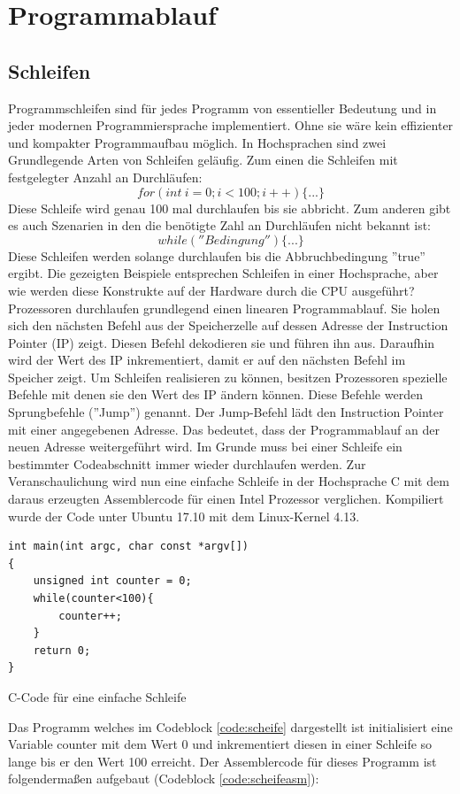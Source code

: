 \documentclass[a4paper,12pt]{article}
\begin{document}

\newpage
\section{Programmablauf}	\label{sec:programmablauf}
\subsection{Schleifen}
Programmschleifen sind für jedes Programm von essentieller Bedeutung und in jeder modernen Programmiersprache implementiert. Ohne sie wäre kein effizienter und kompakter Programmaufbau möglich. In Hochsprachen sind zwei Grundlegende Arten von Schleifen geläufig. Zum einen die Schleifen mit festgelegter Anzahl an Durchläufen: 
$$for(int \ i=0; i<100; i++)\{...\}$$
Diese Schleife wird genau 100 mal durchlaufen bis sie abbricht. Zum anderen gibt es auch Szenarien in den die benötigte Zahl an Durchläufen nicht bekannt ist:
$$while(''Bedingung'')\{...\}$$
Diese Schleifen werden solange durchlaufen bis die Abbruchbedingung ''true'' ergibt. Die gezeigten Beispiele entsprechen Schleifen in einer Hochsprache, aber wie werden diese Konstrukte auf der Hardware durch die CPU ausgeführt?
Prozessoren durchlaufen grundlegend einen linearen Programmablauf. Sie holen sich den nächsten Befehl aus der Speicherzelle auf dessen Adresse der Instruction Pointer (IP) zeigt. Diesen Befehl dekodieren sie und führen ihn aus. Daraufhin wird der Wert des IP inkrementiert, damit er auf den nächsten Befehl im Speicher zeigt. Um Schleifen realisieren zu können, besitzen Prozessoren spezielle Befehle mit denen sie den Wert des IP ändern können. Diese Befehle werden Sprungbefehle (''Jump'') genannt. Der Jump-Befehl lädt den Instruction Pointer mit einer angegebenen Adresse. Das bedeutet, dass der Programmablauf an der neuen Adresse weitergeführt wird. Im Grunde muss bei einer Schleife ein bestimmter Codeabschnitt immer wieder durchlaufen werden. Zur Veranschaulichung wird nun eine einfache Schleife in der Hochsprache C mit dem daraus erzeugten Assemblercode für einen Intel Prozessor verglichen. Kompiliert wurde der Code unter Ubuntu 17.10 mit dem Linux-Kernel 4.13.

\begin{code}[!htb]
\begin{lstlisting}
int main(int argc, char const *argv[])
{
	unsigned int counter = 0;
	while(counter<100){
		counter++;
	}
	return 0;
}
\end{lstlisting}
\caption[C Code einfache Schleife]{C-Code für eine einfache Schleife}
\label{code:scheife}
\end{code}
\newpage
\par\bigskip\noindent Das Programm welches im Codeblock \ref{code:scheife} dargestellt ist initialisiert eine Variable counter mit dem Wert 0 und inkrementiert diesen in einer Schleife so lange bis er den Wert 100 erreicht. Der Assemblercode für dieses Programm ist folgendermaßen aufgebaut (Codeblock \ref{code:scheifeasm}):
\end{document}
